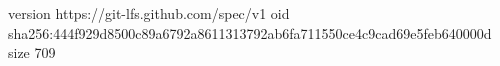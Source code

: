 version https://git-lfs.github.com/spec/v1
oid sha256:444f929d8500c89a6792a8611313792ab6fa711550ce4c9cad69e5feb640000d
size 709
